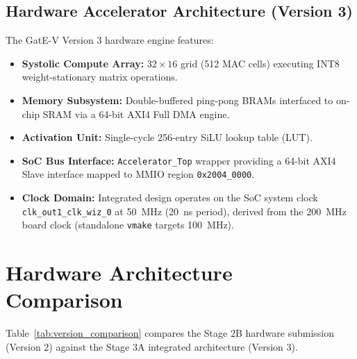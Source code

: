 \documentclass[10pt,journal,compsoc,twocolumn]{IEEEtran}
\begin{document}
\subsection{Hardware Accelerator Architecture (Version 3)}
The GatE-V Version 3 hardware engine features:
\begin{itemize}
    \item \textbf{Systolic Compute Array:} $32 \times 16$ grid (512 MAC cells) executing INT8 weight-stationary matrix operations.
    \item \textbf{Memory Subsystem:} Double-buffered ping-pong BRAMs interfaced to on-chip SRAM via a 64-bit AXI4 Full DMA engine.
    \item \textbf{Activation Unit:} Single-cycle 256-entry SiLU lookup table (LUT).
    \item \textbf{SoC Bus Interface:} \texttt{Accelerator\_Top} wrapper providing a 64-bit AXI4 Slave interface mapped to MMIO region \texttt{0x2004\_0000}.
    \item \textbf{Clock Domain:} Integrated design operates on the SoC system clock \texttt{clk\_out1\_clk\_wiz\_0} at 50~MHz (20~ns period), derived from the 200~MHz board clock (standalone \texttt{vmake} targets 100~MHz).
\end{itemize}

\section{Hardware Architecture Comparison}

Table~\ref{tab:version_comparison} compares the Stage 2B hardware submission (Version 2) against the Stage 3A integrated architecture (Version 3).
\end{document}
